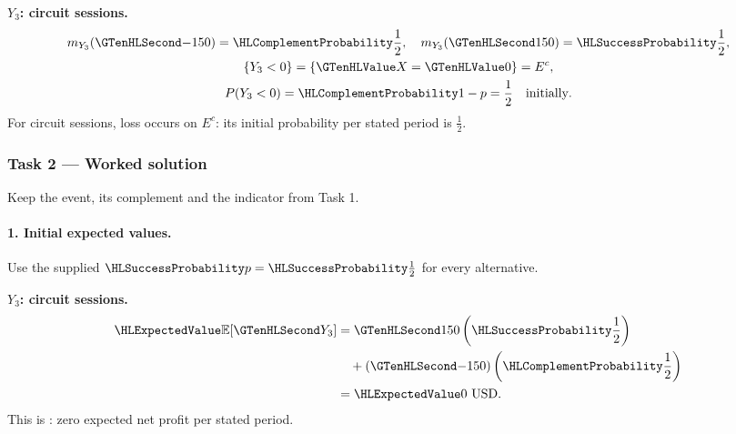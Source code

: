 \noindent\begin{minipage}[t]{.48\linewidth}
\textbf{$Y_3$: circuit sessions.}
\[
\begin{gathered}
m_{Y_3}(\Money{-150})=\FailureProb{\frac{1}{2}},\quad m_{Y_3}(\Money{150})=\SuccessProb{\frac{1}{2}},\\
\{Y_3<0\}=\{\Indicator{X}=\Indicator{0}\}=E^c,\\
P(Y_3<0)=\FailureProb{1-p}= \frac{1}{2}\quad\text{initially}.
\end{gathered}
\]
For circuit sessions, loss occurs on $E^c$: its initial probability per stated period is $\frac{1}{2}$.
\end{minipage}\par
{}
\clearpage\subsubsection*{Task 2 --- Worked solution}\label{sol:c3-agriculture-decision}
Keep the event, its complement and the indicator from Task 1.
\paragraph{1. Initial expected values.}
Use the supplied $\SuccessProb{p}=\SuccessProb{\frac{1}{2}}$ for every alternative.
\noindent\begin{minipage}[t]{.48\linewidth}
\textbf{$Y_3$: circuit sessions.}
\[
\begin{aligned}
\ExpectedValue{\mathbb E}[\Money{Y_3}]&=\Money{150}\left(\SuccessProb{\frac{1}{2}}\right)\\
&\quad +(\Money{-150})\left(\FailureProb{\frac{1}{2}}\right)\\
&=\ExpectedValue{0\ \text{USD}}.
\end{aligned}
\]
This is : zero expected net profit per stated period.
\end{minipage}\par
